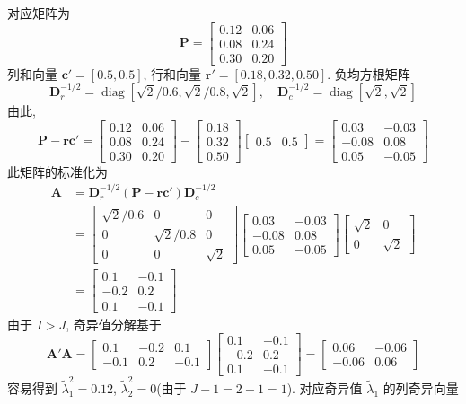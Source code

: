 对应矩阵为
\[
\mathbf{P}=\begin{bmatrix}0.12&0.06\\0.08&0.24\\0.30&0.20\end{bmatrix}
\]
列和向量 $\mathbf{c}'=[0.5,0.5]$, 行和向量 $\mathbf{r}'=[0.18,0.32,0.50]$. 负均方根矩阵
\[
\mathbf{D}_r^{-1/2}=\operatorname{diag}\left[\sqrt{2}/0.6,\sqrt{2}/0.8,\sqrt{2}\right],\quad
\mathbf{D}_c^{-1/2}=\operatorname{diag}\left[\sqrt{2},\sqrt{2}\right]
\]
由此,
\[
\mathbf{P}-\mathbf{r}\mathbf{c}'=
\begin{bmatrix}0.12&0.06\\0.08&0.24\\0.30&0.20\end{bmatrix}
-\begin{bmatrix}0.18\\0.32\\0.50\end{bmatrix}
\begin{bmatrix}0.5&0.5\end{bmatrix}
=\begin{bmatrix}0.03&-0.03\\-0.08&0.08\\0.05&-0.05\end{bmatrix}
\]
此矩阵的标准化为
\[
\begin{aligned}
\mathbf{A}&=\mathbf{D}_r^{-1/2}(\mathbf{P}-\mathbf{r}\mathbf{c}')\mathbf{D}_c^{-1/2}\\
&=\begin{bmatrix}\sqrt{2}/0.6&0&0\\0&\sqrt{2}/0.8&0\\0&0&\sqrt{2}\end{bmatrix}
\begin{bmatrix}0.03&-0.03\\-0.08&0.08\\0.05&-0.05\end{bmatrix}
\begin{bmatrix}\sqrt{2}&0\\0&\sqrt{2}\end{bmatrix}\\
&=\begin{bmatrix}0.1&-0.1\\-0.2&0.2\\0.1&-0.1\end{bmatrix}
\end{aligned}
\]
由于 $I>J$, 奇异值分解基于
\[
\mathbf{A}'\mathbf{A}=
\begin{bmatrix}0.1&-0.2&0.1\\-0.1&0.2&-0.1\end{bmatrix}
\begin{bmatrix}0.1&-0.1\\-0.2&0.2\\0.1&-0.1\end{bmatrix}
=\begin{bmatrix}0.06&-0.06\\-0.06&0.06\end{bmatrix}
\]
容易得到 $\tilde{\lambda}_1^2=0.12$, $\tilde{\lambda}_2^2=0$(由于 $J-1=2-1=1$). 对应奇异值 $\tilde{\lambda}_1$ 的列奇异向量
